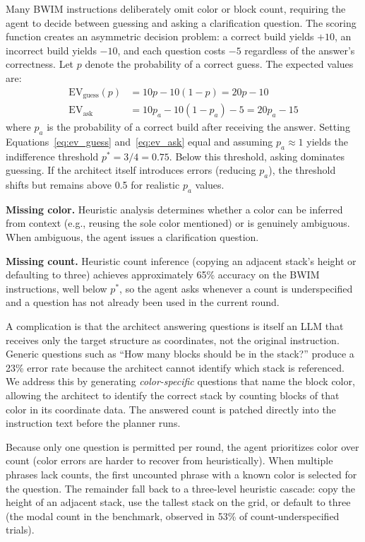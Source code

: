 \documentclass{article}
\begin{document}
Many BWIM instructions deliberately omit color or block count,
requiring the agent to decide between guessing and asking a clarification
question. The scoring function creates an asymmetric decision problem: a
correct build yields $+10$, an incorrect build yields $-10$, and each
question costs $-5$ regardless of the answer's correctness. Let $p$ denote
the probability of a correct guess. The expected values are:
\begin{align}
  \text{EV}_{\text{guess}}(p) &= 10p - 10(1 - p) = 20p - 10 \label{eq:ev_guess} \\
  \text{EV}_{\text{ask}} &= 10p_a - 10(1 - p_a) - 5 = 20p_a - 15 \label{eq:ev_ask}
\end{align}
where $p_a$ is the probability of a correct build after receiving the
answer. Setting Equations~\ref{eq:ev_guess} and~\ref{eq:ev_ask} equal and
assuming $p_a \approx 1$ yields the indifference threshold $p^* = 3/4
= 0.75$. Below this threshold, asking dominates guessing.
If the architect itself introduces errors (reducing $p_a$), the
threshold shifts but remains above 0.5 for realistic $p_a$ values.

\textbf{Missing color.} Heuristic analysis determines whether a color
can be inferred from context (e.g., reusing the sole color mentioned) or is
genuinely ambiguous. When ambiguous, the agent issues a clarification
question.

\textbf{Missing count.} Heuristic count inference (copying an adjacent
stack's height or defaulting to three) achieves approximately 65\% accuracy
on the BWIM instructions, well below $p^*$, so the agent asks whenever a
count is underspecified and a question has not already been used in the
current round.

A complication is that the architect answering questions is itself an LLM
that receives only the target structure as coordinates, not the original
instruction. Generic questions such as ``How many blocks should be in the
stack?'' produce a 23\% error rate because the architect cannot identify
which stack is referenced. We address this by generating
\emph{color-specific} questions that name the block color, allowing the
architect to identify the correct stack by counting blocks of that color in
its coordinate data. The answered count is patched directly into the
instruction text before the planner runs.

Because only one question is permitted per round, the agent prioritizes
color over count (color errors are harder to recover from heuristically).
When multiple phrases lack counts, the first uncounted phrase with a known
color is selected for the question. The remainder fall back to a three-level
heuristic cascade: copy the height of an adjacent stack, use the tallest
stack on the grid, or default to three (the modal count in the benchmark,
observed in 53\% of count-underspecified trials).
\end{document}
